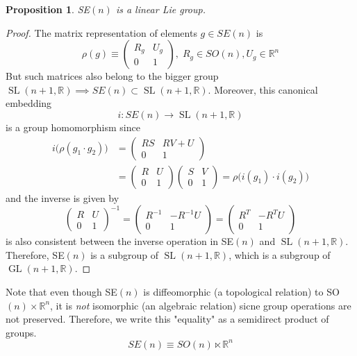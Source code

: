 \documentclass{article}
\DeclareMathOperator{\GL}{GL}
\DeclareMathOperator{\SL}{SL}
\newtheorem{proposition}[theorem]{Proposition}
\theoremstyle{remark}
\theoremstyle{definition}
\begin{document}
\begin{proposition}
SE$(n)$ is a linear Lie group. 
\end{proposition}
\begin{proof}
The matrix representation of elements $g \in SE(n)$ is 
\[\rho(g) \equiv \begin{pmatrix}
R_g & U_g \\ 0 & 1
\end{pmatrix}, \; R_g \in SO(n), U_g \in \mathbb{R}^n\]
But such matrices also belong to the bigger group $\SL(n+1, \mathbb{R}) \implies SE(n) \subset \SL(n+1, \mathbb{R})$. Moreover, this canonical embedding 
\[i: SE(n) \longrightarrow \SL(n+1, \mathbb{R})\]
is a group homomorphism since
\begin{align*}
    i\big( \rho(g_1 \cdot g_2) \big) & = \begin{pmatrix}
    RS & RV + U \\ 0 & 1
    \end{pmatrix} \\
    & = \begin{pmatrix}
    R & U \\ 0 & 1
    \end{pmatrix} \begin{pmatrix}
    S & V \\ 0 & 1
    \end{pmatrix} = \rho \big( i(g_1) \cdot i(g_2) \big) 
\end{align*}
and the inverse is given by 
\[\begin{pmatrix}
R & U \\ 0 & 1
\end{pmatrix}^{-1} = \begin{pmatrix}
R^{-1} & - R^{-1} U \\ 0 & 1
\end{pmatrix} = \begin{pmatrix}
R^T & - R^T U \\ 0 & 1
\end{pmatrix}\]
is also consistent between the inverse operation in SE$(n)$ and $\SL(n+1, \mathbb{R})$. Therefore, SE$(n)$ is a subgroup of $\SL(n+1, \mathbb{R})$, which is a subgroup of $\GL(n+1, \mathbb{R})$. 
\end{proof}

Note that even though SE$(n)$ is diffeomorphic (a topological relation) to SO$(n) \times \mathbb{R}^n$, it is \textit{not} isomorphic (an algebraic relation) sicne group operations are not preserved. Therefore, we write this "equality" as a semidirect product of groups. 
\[SE(n) \equiv SO(n) \ltimes \mathbb{R}^n\]
\end{document}
